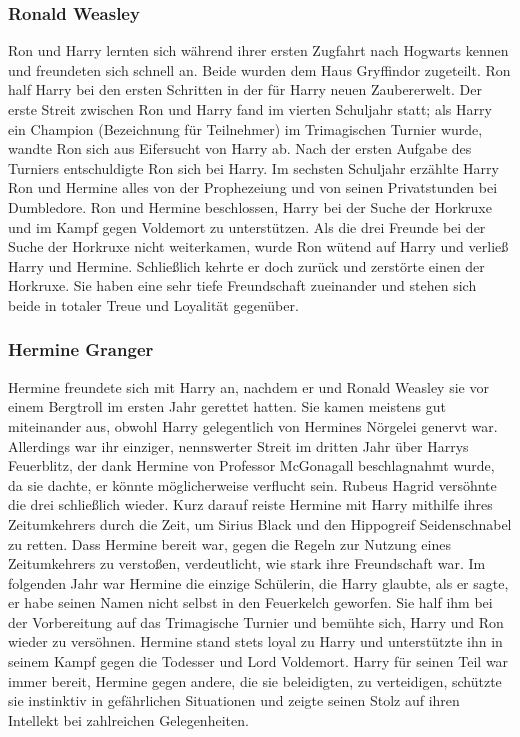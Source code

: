 \documentclass[a4paper, 10pt]{article}
\begin{document}
\subsubsection*{\large Ronald Weasley}
Ron und Harry lernten sich während ihrer ersten Zugfahrt nach Hogwarts kennen und freundeten sich schnell an. Beide wurden dem Haus Gryffindor zugeteilt. Ron half Harry bei den ersten Schritten in der für Harry neuen Zaubererwelt. Der erste Streit zwischen Ron und Harry fand im vierten Schuljahr statt; als Harry ein Champion (Bezeichnung für Teilnehmer) im Trimagischen Turnier wurde, wandte Ron sich aus Eifersucht von Harry ab. Nach der ersten Aufgabe des Turniers entschuldigte Ron sich bei Harry. Im sechsten Schuljahr erzählte Harry Ron und Hermine alles von der Prophezeiung und von seinen Privatstunden bei Dumbledore. Ron und Hermine beschlossen, Harry bei der Suche der Horkruxe und im Kampf gegen Voldemort zu unterstützen. Als die drei Freunde bei der Suche der Horkruxe nicht weiterkamen, wurde Ron wütend auf Harry und verließ Harry und Hermine. Schließlich kehrte er doch zurück und zerstörte einen der Horkruxe. Sie haben eine sehr tiefe Freundschaft zueinander und stehen sich beide in totaler Treue und Loyalität gegenüber.
\subsubsection*{\large Hermine Granger}
Hermine freundete sich mit Harry an, nachdem er und Ronald Weasley sie vor einem Bergtroll im ersten Jahr gerettet hatten. Sie kamen meistens gut miteinander aus, obwohl Harry gelegentlich von Hermines Nörgelei genervt war. Allerdings war ihr einziger, nennswerter Streit im dritten Jahr über Harrys Feuerblitz, der dank Hermine von Professor McGonagall beschlagnahmt wurde, da sie dachte, er könnte möglicherweise verflucht sein. Rubeus Hagrid versöhnte die drei schließlich wieder. Kurz darauf reiste Hermine mit Harry mithilfe ihres Zeitumkehrers durch die Zeit, um Sirius Black und den Hippogreif Seidenschnabel zu retten. Dass Hermine bereit war, gegen die Regeln zur Nutzung eines Zeitumkehrers zu verstoßen, verdeutlicht, wie stark ihre Freundschaft war. Im folgenden Jahr war Hermine die einzige Schülerin, die Harry glaubte, als er sagte, er habe seinen Namen nicht selbst in den Feuerkelch geworfen. Sie half ihm bei der Vorbereitung auf das Trimagische Turnier und bemühte sich, Harry und Ron wieder zu versöhnen.
\vspace{10pt}
\newline
{}  
Hermine stand stets loyal zu Harry und unterstützte ihn in seinem Kampf gegen die Todesser und Lord Voldemort.
\vspace{10pt}
\newline
{}  
Harry für seinen Teil war immer bereit, Hermine gegen andere, die sie beleidigten, zu verteidigen, schützte sie instinktiv in gefährlichen Situationen und zeigte seinen Stolz auf ihren Intellekt bei zahlreichen Gelegenheiten.
\end{document}

